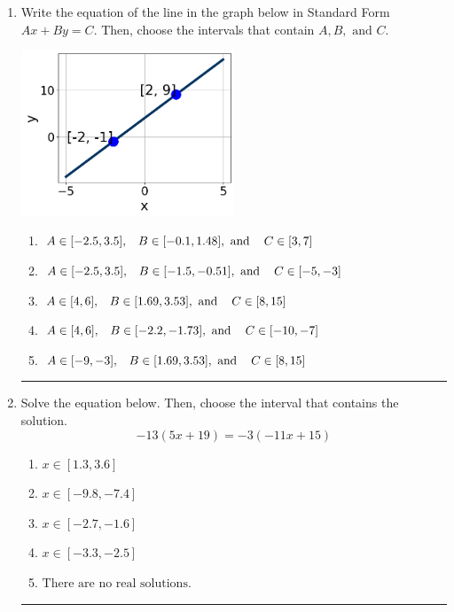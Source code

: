 \documentclass[14pt]{extbook}
\newcommand{\litem}[1]{\item#1\hspace*{-1cm}\rule{\textwidth}{0.4pt}}
\begin{document}
\begin{enumerate}
{\begin{enumerate}[label=\Alph*.]
\end{enumerate} }
\litem{
Write the equation of the line in the graph below in Standard Form $Ax+By=C$. Then, choose the intervals that contain $A, B, \text{ and } C$.
\begin{center}
    \includegraphics[width=0.5\textwidth]{../Figures/linearGraphToStandardC.png}
\end{center}
\begin{enumerate}[label=\Alph*.]
\item \( A \in [-2.5, 3.5], \hspace{3mm} B \in [-0.1, 1.48], \text{ and } \hspace{3mm} C \in [3, 7] \)
\item \( A \in [-2.5, 3.5], \hspace{3mm} B \in [-1.5, -0.51], \text{ and } \hspace{3mm} C \in [-5, -3] \)
\item \( A \in [4, 6], \hspace{3mm} B \in [1.69, 3.53], \text{ and } \hspace{3mm} C \in [8, 15] \)
\item \( A \in [4, 6], \hspace{3mm} B \in [-2.2, -1.73], \text{ and } \hspace{3mm} C \in [-10, -7] \)
\item \( A \in [-9, -3], \hspace{3mm} B \in [1.69, 3.53], \text{ and } \hspace{3mm} C \in [8, 15] \)

\end{enumerate} }
\litem{
Solve the equation below. Then, choose the interval that contains the solution.\[ -13(5x + 19) = -3(-11x + 15) \]\begin{enumerate}[label=\Alph*.]
\item \( x \in [1.3, 3.6] \)
\item \( x \in [-9.8, -7.4] \)
\item \( x \in [-2.7, -1.6] \)
\item \( x \in [-3.3, -2.5] \)
\item \( \text{There are no real solutions.} \)


\end{enumerate}}
\end{enumerate}
\end{document}
